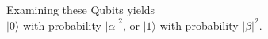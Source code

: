 \documentclass[preview]{standalone}
\begin{document}
\begin{center}
Examining these Qubits yields \\ $ | 0 \rangle $ with probability $ | \alpha |^2 $, or $ |1 \rangle$  with probability $ | \beta |^2 $.
\end{center}
\end{document}
